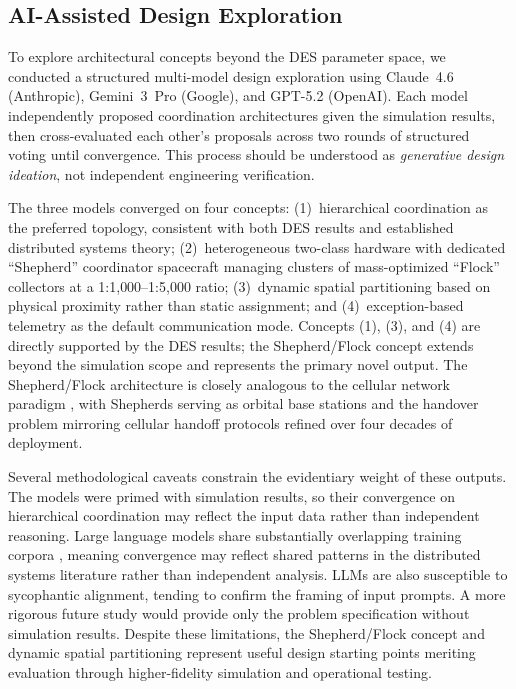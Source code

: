 \documentclass[journal]{IEEEtran}
\begin{document}
\subsection{AI-Assisted Design Exploration}

To explore architectural concepts beyond the DES parameter space, we conducted a structured multi-model design exploration using Claude~4.6 (Anthropic), Gemini~3~Pro (Google), and GPT-5.2 (OpenAI). Each model independently proposed coordination architectures given the simulation results, then cross-evaluated each other's proposals across two rounds of structured voting until convergence. This process should be understood as \emph{generative design ideation}, not independent engineering verification.

The three models converged on four concepts: (1)~hierarchical coordination as the preferred topology, consistent with both DES results and established distributed systems theory; (2)~heterogeneous two-class hardware with dedicated ``Shepherd'' coordinator spacecraft managing clusters of mass-optimized ``Flock'' collectors at a 1:1{,}000--1:5{,}000 ratio; (3)~dynamic spatial partitioning based on physical proximity rather than static assignment; and (4)~exception-based telemetry as the default communication mode. Concepts (1), (3), and (4) are directly supported by the DES results; the Shepherd/Flock concept extends beyond the simulation scope and represents the primary novel output. The Shepherd/Flock architecture is closely analogous to the cellular network paradigm \cite{rappaport_wireless}, with Shepherds serving as orbital base stations and the handover problem mirroring cellular handoff protocols refined over four decades of deployment.

Several methodological caveats constrain the evidentiary weight of these outputs. The models were primed with simulation results, so their convergence on hierarchical coordination may reflect the input data rather than independent reasoning. Large language models share substantially overlapping training corpora \cite{brown_gpt3}, meaning convergence may reflect shared patterns in the distributed systems literature rather than independent analysis. LLMs are also susceptible to sycophantic alignment, tending to confirm the framing of input prompts. A more rigorous future study would provide only the problem specification without simulation results. Despite these limitations, the Shepherd/Flock concept and dynamic spatial partitioning represent useful design starting points meriting evaluation through higher-fidelity simulation and operational testing.
\end{document}
